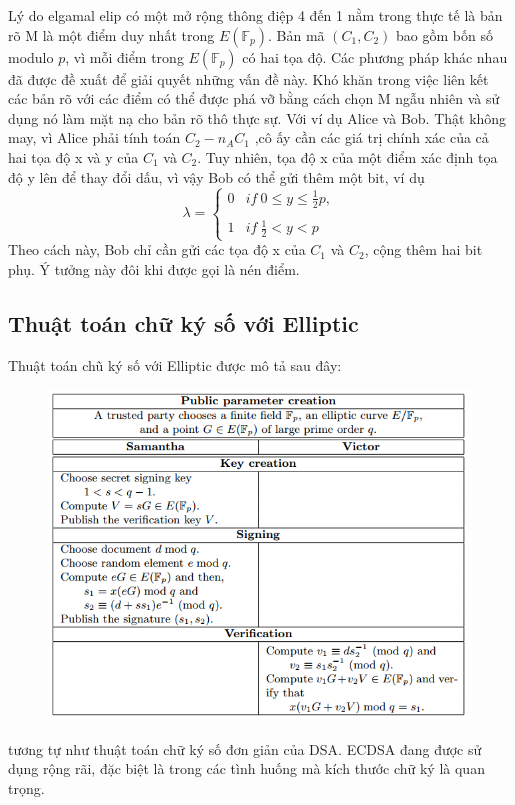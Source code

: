 \documentclass[a4paper,12pt]{report}
\begin{document}
Lý do elgamal elip có một mở rộng thông điệp 4 đến 1 nằm trong thực tế là bản rõ M là một điểm duy nhất trong $E(\mathbb{F}_p)$. Bản mã $(C_1, C_2)$ bao gồm bốn số modulo $p$, vì mỗi điểm trong $E(\mathbb{F}_p)$ có hai tọa độ. Các phương pháp khác nhau đã được đề xuất để giải quyết những vấn đề này. Khó khăn trong việc liên kết các bản rõ với các điểm có thể được phá vỡ bằng cách chọn M ngẫu nhiên và sử dụng nó làm mặt nạ cho bản rõ thô thực sự.
Với ví dụ Alice và Bob. Thật không may, vì Alice phải tính toán $C_2 - n_AC_1$ ,cô ấy cần các giá trị chính xác của cả hai tọa độ x và y của $C_1$ và $C_2$. Tuy nhiên, tọa độ x của một điểm xác định tọa độ y lên để thay đổi dấu, vì vậy Bob có thể gửi thêm một bit, ví dụ
\begin{displaymath}
\lambda = \left\{ \begin{array}{ll}
\displaystyle 0 & if \  0 \leq y \leq \frac{1}{2}p,\\
\\
\displaystyle 1 & if \ \frac{1}{2} < y < p
\end{array} \right.
\end{displaymath}
Theo cách này, Bob chỉ cần gửi các tọa độ x của $C_1$ và $C_2$, cộng thêm hai bit phụ. Ý tưởng này đôi khi được gọi là nén điểm.
\subsection*{Thuật toán chữ ký số với Elliptic}
Thuật toán chũ ký số với Elliptic được mô tả sau đây:\\
\begin{figure}[h]
\begin{center}
\includegraphics[scale=0.9]{../im6.png}
\caption{}
\end{center}
\end{figure}
tương tự như thuật toán chữ ký số đơn giản của DSA. ECDSA đang được sử dụng rộng rãi, đặc biệt là trong các tình huống mà kích thước chữ ký là quan trọng. \\
\end{document}
